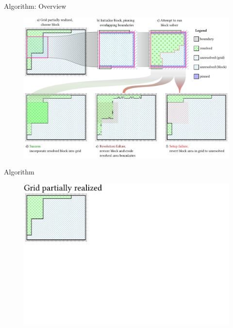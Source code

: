 \documentclass{beamer}
\begin{document}
  \begin{frame}[fragile]{Algorithm: Overview }
    \begin{figure}
      \includegraphics[width=\textwidth]{figs/poms_figalg.pdf}
    \end{figure}
  \end{frame}

  \begin{frame}[fragile]{Algorithm}
    \begin{figure}
      \includegraphics[width=\textwidth]{figs/poms_alg0.pdf}
    \end{figure}
  \end{frame}
\end{document}
